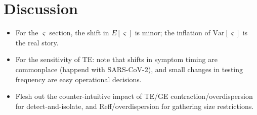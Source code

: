 \section{Discussion}



\begin{itemize}
	\item For the $\varsigma$ section, the shift in $E[\varsigma]$ is minor; the inflation of $\text{Var}[\varsigma]$ is the real story. 
	\item For the sensitivity of TE: note that shifts in symptom timing are commonplace (happend with SARS-CoV-2), and small changes in testing frequency are easy operational decisions. 
	\item Flesh out the counter-intuitive impact of TE/GE contraction/overdispersion for detect-and-isolate, and Reff/overdispersion for gathering size restrictions. 
\end{itemize}







